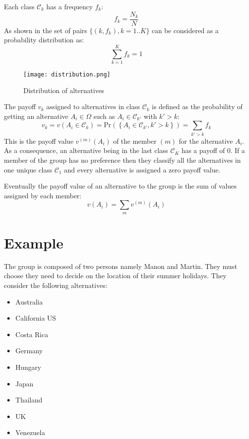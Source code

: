\documentclass[12pt,a4paper]{article}
\begin{document}
Each class $\mathcal{C}_k$ has a frequency $f_k$:
\begin{equation}
f_k = \frac{N_k}{N}
\end{equation}
As shown in the set of pairs $\{(k,f_k), k=1..K\}$ can be considered as a probability distribution as:
\begin{equation}
\sum_{k=1}^K{f_k} = 1
\end{equation}

\begin{figure}[h]
\centering
\texttt{[image: distribution.png]}
\caption{Distribution of alternatives}
\label{fig:distribution}
\end{figure}
The payoff $v_k$ assigned to alternatives in class $\mathcal{C}_k$ is defined as the probability of getting an alternative $A_i\in\Omega$ such as $A_i\in\mathcal{C}_{k'}$ with $k'>k$:
\begin{equation}
v_k = v\left(A_i\in\mathcal{C}_k\right)=\mathrm{Pr}\left(\left\lbrace A_i\in\mathcal{C}_{k'}, k'>k\right\rbrace\right)=\sum_{k'>k}{f_k}
\end{equation}
This is the payoff value $v^{(m)}(A_i)$ of the member $(m)$ for the alternative $A_i$.
As a consequence, an alternative being in the last class $\mathcal{C}_K$ has a payoff of 0. If a member of the group has no preference then they classify all the alternatives in one unique class $\mathcal{C}_1$ and every alternative is assigned a zero payoff value.

Eventually the payoff value of an alternative to the group is the sum of values assigned by each member:
\begin{equation}\label{eq_alternatives_payoff}
v\left(A_i\right)=\sum_{m}{v^{(m)}(A_i)}
\end{equation}

\section{Example}

The group is composed of two persons namely Manon and Martin. They must choose they need to decide on the location of their summer holidays. They consider the following alternatives:
\begin{itemize}
\item Australia
\item California US
\item Costa Rica
\item Germany
\item Hungary
\item Japan
\item Thailand
\item UK
\item Venezuela
\end{itemize}
\end{document}
